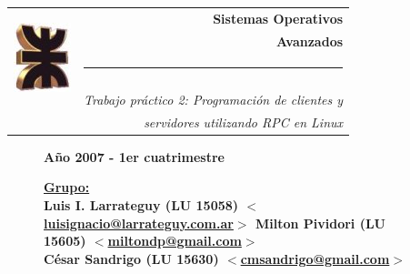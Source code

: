 \thispagestyle{empty}

\begin{center}
\begin{tabular}{cr}
\multirow{5}{*}{ \includegraphics{logoUTN.jpg} }
& \Huge\bfseries Sistemas Operativos \\
& \Huge\bfseries Avanzados \\
& \noindent\rule[-1ex]{120mm}{4pt} \\
& \\
& \noindent\large\emph{Trabajo práctico 2: Programación de clientes y} \\
& \noindent\large\emph{servidores utilizando RPC en Linux}
\end{tabular}
\end{center}


\begin{figure}[b]
\center\large\textbf{Año 2007 - 1er cuatrimestre}
\normalsize
\linebreak
\begin{flushleft}
\bfseries
\underline{Grupo:}\\
Luis I. Larrateguy (\textnormal{LU} 15058) \href{mailto:luisignacio@larrateguy.com.ar}
  {$<$luisignacio@larrateguy.com.ar$>$}
Milton Pividori (\textnormal{LU} 15605) \href{mailto:miltondp@gmail.com}
  {$<$miltondp@gmail.com$>$}\\
César Sandrigo (\textnormal{LU} 15630) \href{mailto:cmsandrigo@gmail.com}
  {$<$cmsandrigo@gmail.com$>$}
\end{flushleft}

\end{figure}

